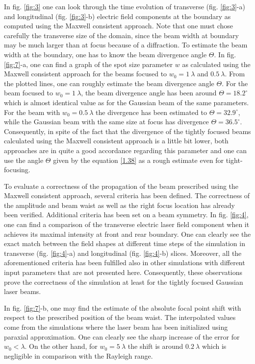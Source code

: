 In fig. \ref{fig:3} one can look through the time evolution of transverse (fig. \ref{fig:3}-a) and longitudinal (fig. \ref{fig:3}-b) electric field components at the boundary as computed using the Maxwell consistent approach. Note that one must chose carefully the transverse size of the domain, since the beam width at boundary may be much larger than at focus because of a diffraction. To estimate the beam width at the boundary, one has to know the beam divergence angle $ \Theta $. In fig. \ref{fig:7}-a, one can find a graph of the spot size parameter $ w $ as calculated using the Maxwell consistent approach for the beams focused to $ w_0 = 1 \ \lambda $ and $ 0.5 \ \lambda $. From the plotted lines, one can roughly estimate the beam divergence angle $ \Theta $. For the beam focused to $ w_0 = 1 \ \lambda $, the beam divergence angle has been around $ \Theta = 18.2^{\circ} $ which is almost identical value as for the Gaussian beam of the same parameters. For the beam with $ w_0 = 0.5 \ \lambda $ the divergence has been estimated to $ \Theta = 32.9^{\circ} $, while the Gaussian beam with the same size at focus has divergence $ \Theta = 36.5^{\circ} $. Consequently, in spite of the fact that the divergence of the tightly focused beams calculated using the Maxwell consistent approach is a little bit lower, both approaches are in quite a good accordance regarding this parameter and one can use the angle $ \Theta $ given by the equation \ref{1.38} as a rough estimate even for tight-focusing.

To evaluate a correctness of the propagation of the beam prescribed using the Maxwell consistent approach, several criteria has been defined. The correctness of the amplitude and beam waist as well as the right focus location has already been verified. Additional criteria has been set on a beam symmetry. In fig. \ref{fig:4}, one can find a comparison of the transverse electric laser field component when it achieves its maximal intensity at front and rear boundary. One can clearly see the exact match between the field shapes at different time steps of the simulation in transverse (fig. \ref{fig:4}-a) and longitudinal (fig. \ref{fig:4}-b) slices. Moreover, all the aforementioned criteria has been fulfilled also in other simulations with different input parameters that are not presented here. Consequently, these observations prove the correctness of the simulation at least for the tightly focused Gaussian laser beams.

In fig. \ref{fig:7}-b, one may find the estimate of the absolute focal point shift with respect to the prescribed position of the beam waist. The interpolated values come from the simulations where the laser beam has been initialized using paraxial approximation. One can clearly see the sharp increase of the error for $ w_0 < \lambda $. On the other hand, for $ w_0 = 5 \ \lambda $ the shift is around $ 0.2 \ \lambda $ which is negligible in comparison with the Rayleigh range.

